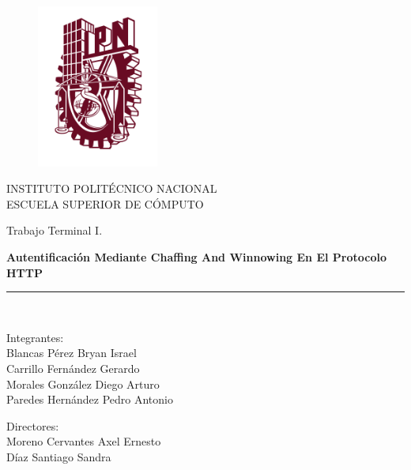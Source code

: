 \documentclass[12pt, a4paper, titlepage]{report}
\begin{document}
	
	\begin{titlepage}
		
		\vspace*{-1.5in}
		\begin{figure}[htb]
			\begin{center}
				\includegraphics[width=4cm]{./imagenes/logoipn.png}
			\end{center}
		\end{figure}
		
		\begin{center}
		INSTITUTO POLITÉCNICO NACIONAL\\
		\vspace*{0.2in}
		ESCUELA SUPERIOR DE CÓMPUTO\\
		\vspace*{0.6in}
		\begin{large}
			Trabajo Terminal I.\\
		\end{large}
		\vspace*{0.2in}
		\begin{Large}
			\textbf{Autentificación Mediante Chaffing And Winnowing En El Protocolo HTTP} \\
		\end{Large}
		\vspace*{0.3in}
		\rule{80mm}{0.1mm}\\
		\vspace*{0.1in}
		\begin{large}
			\begin{center}
				Integrantes:\\
				Blancas Pérez Bryan Israel\\
				Carrillo Fernández Gerardo\\
				Morales González Diego Arturo\\
				Paredes Hernández Pedro Antonio\\
			\end{center}
		\end{large}
		\begin{large}
			Directores:\\
			Moreno Cervantes Axel Ernesto\\
			Díaz Santiago Sandra\\
		\end{large}
		\end{center}

	\end{titlepage}
	
\end{document}
